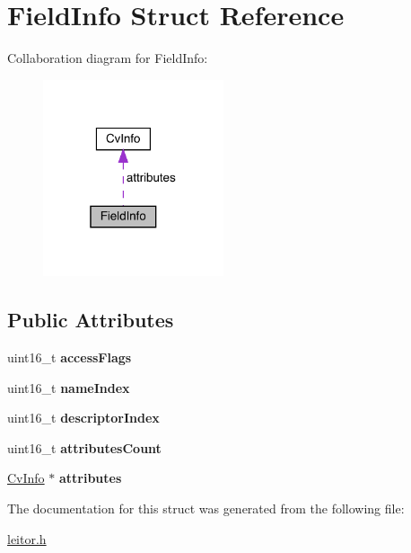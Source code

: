 \hypertarget{structFieldInfo}{}\section{Field\+Info Struct Reference}
\label{structFieldInfo}


Collaboration diagram for Field\+Info\+:
\nopagebreak
\begin{figure}[H]
\begin{center}
\leavevmode
\includegraphics[width=151pt]{structFieldInfo__coll__graph}
\end{center}
\end{figure}
\subsection*{Public Attributes}
\begin{DoxyCompactItemize}
\item 
\mbox{\label{structFieldInfo_a5fd94bd00a430098ff830c231d3f7a53}} 
uint16\+\_\+t {\bfseries access\+Flags}
\item 
\mbox{\label{structFieldInfo_a88ea5c29063df8933d5277e846924b1e}} 
uint16\+\_\+t {\bfseries name\+Index}
\item 
\mbox{\label{structFieldInfo_ab6cc30d06db3569171dd6fdcba7add29}} 
uint16\+\_\+t {\bfseries descriptor\+Index}
\item 
\mbox{\label{structFieldInfo_ad8eae2b3a0fccae8700ca53263983c6e}} 
uint16\+\_\+t {\bfseries attributes\+Count}
\item 
\mbox{\label{structFieldInfo_a44bc588a62523995db41f7186d6d4253}} 
\mbox{\hyperlink{structCvInfo}{Cv\+Info}} $\ast$ {\bfseries attributes}
\end{DoxyCompactItemize}


The documentation for this struct was generated from the following file\+:\begin{DoxyCompactItemize}
\item 
\mbox{\hyperlink{leitor_8h}{leitor.\+h}}\end{DoxyCompactItemize}
